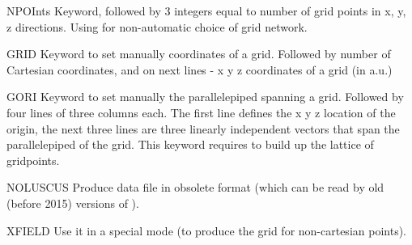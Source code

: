 \begin{keywordlist}
\item[NPOInts]
Keyword, followed by 3 integers equal to number of grid points
in x, y, z directions. Using for non-automatic choice of grid network.
\item[GRID]
Keyword to set manually coordinates of a grid. Followed by number of
Cartesian coordinates, and on next lines - x y z coordinates of
a grid (in a.u.)
\item[GORI]
Keyword to set manually the parallelepiped spanning a grid.
Followed by four lines of three columns each.
The first line defines the x y z location of the origin,
the next three lines are three linearly independent vectors
that span the parallelepiped of the grid.
This keyword requires  to build up the lattice of gridpoints.
\item[NOLUSCUS]
Produce data file in obsolete format (which can be read by old 
(before 2015) versions of ).
\item[XFIELD]
Use  it in a special mode (to produce the grid for non-cartesian points).

\end{keywordlist}

